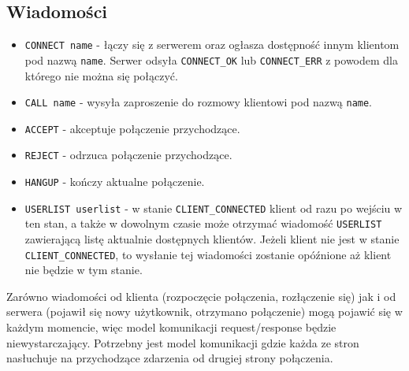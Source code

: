 \subsection*{Wiadomości}

\begin{itemize}
      \item \verb|CONNECT name| - łączy się z serwerem oraz ogłasza dostępność innym klientom pod
            nazwą \verb|name|. Serwer odsyła \verb|CONNECT_OK| lub \verb|CONNECT_ERR| z powodem dla
            którego nie można się połączyć.
      \item \verb|CALL name| - wysyła zaproszenie do rozmowy klientowi pod nazwą \verb|name|.
      \item \verb|ACCEPT| - akceptuje połączenie przychodzące.
      \item \verb|REJECT| - odrzuca połączenie przychodzące.
      \item \verb|HANGUP| - kończy aktualne połączenie.
      \item \verb|USERLIST userlist| - w stanie \verb|CLIENT_CONNECTED| klient od razu po wejściu w
            ten stan, a także w dowolnym czasie może otrzymać wiadomość \verb|USERLIST| zawierającą
            listę aktualnie dostępnych klientów. Jeżeli klient nie jest w stanie
            \verb|CLIENT_CONNECTED|, to wysłanie tej wiadomości zostanie opóźnione aż klient nie
            będzie w tym stanie.

\end{itemize}

Zarówno wiadomości od klienta (rozpoczęcie połączenia, rozłączenie się) jak i od serwera (pojawił
się nowy użytkownik, otrzymano połączenie) mogą pojawić się w każdym momencie, więc model
komunikacji request/response będzie niewystarczający. Potrzebny jest model komunikacji gdzie każda
ze stron nasłuchuje na przychodzące zdarzenia od drugiej strony połączenia.


